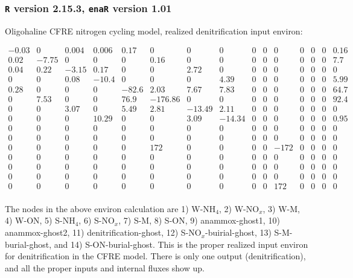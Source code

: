 \documentclass[]{article}
\begin{document}
\subsubsection{\texttt{R} version 2.15.3, \texttt{enaR} version 1.01}

Oligohaline CFRE nitrogen cycling model, realized denitrification input environ:  

\tiny

\[
\begin{array}{ccccccccccccccc}
  -0.03 & 0 & 0.004 & 0.006 & 0.17 & 0 & 0 & 0 & 0 & 0 & 0 & 0 & 0 & 0 &
  0.16  \\
  0.02 & -7.75 & 0 & 0 & 0 & 0.16 & 0 & 0 & 0 & 0 & 0 & 0 & 0 & 0 & 7.7
  \\
  0.04 & 0.22 & -3.15 & 0.17 & 0 & 0 & 2.72 & 0 & 0 & 0 & 0 & 0 & 0 & 0
  & 0 \\
  0 & 0 & 0.08 & -10.4 & 0 & 0 & 0 & 4.39 & 0 & 0 & 0 & 0 & 0 & 0 & 5.99
  \\
  0.28 & 0 & 0 & 0 & -82.6 & 2.03 & 7.67 & 7.83 & 0 & 0 & 0 & 0 & 0 & 0
  & 64.7 \\
  0 & 7.53 & 0 & 0 & 76.9 & -176.86 & 0 & 0 & 0 & 0 & 0 & 0 & 0 & 0 &
  92.4 \\
  0 & 0 & 3.07 & 0 & 5.49 & 2.81 & -13.49 & 2.11 & 0 & 0 & 0 & 0 & 0 & 0
  & 0 \\
  0 & 0 & 0 & 10.29 & 0 & 0 & 3.09 & -14.34 & 0 & 0 & 0 & 0 & 0 & 0 &
  0.95 \\
  0 & 0 & 0 & 0 & 0 & 0 & 0 & 0 & 0 & 0 & 0 & 0 & 0 & 0 & 0 \\
  0 & 0 & 0 & 0 & 0 & 0 & 0 & 0 & 0 & 0 & 0 & 0 & 0 & 0 & 0 \\
  0 & 0 & 0 & 0 & 0 & 172 & 0 & 0 & 0 & 0 & -172 & 0 & 0 & 0 & 0 \\
  0 & 0 & 0 & 0 & 0 & 0 & 0 & 0 & 0 & 0 & 0 & 0 & 0 & 0 & 0 \\
  0 & 0 & 0 & 0 & 0 & 0 & 0 & 0 & 0 & 0 & 0 & 0 & 0 & 0 & 0 \\
  0 & 0 & 0 & 0 & 0 & 0 & 0 & 0 & 0 & 0 & 0 & 0 & 0 & 0 & 0 \\
  0 & 0 & 0 & 0 & 0 & 0 & 0 & 0 & 0 & 0 & 172 & 0 & 0 & 0 & 0 \\
\end{array}
\]

\normalsize

The nodes in the above environ calculation are 1) W-NH$_4$, 2)
W-NO$_x$, 3) W-M, 4) W-ON, 5) S-NH$_4$, 6) S-NO$_x$, 7) S-M, 8) S-ON,
9) anammox-ghost1, 10) anammox-ghost2, 11) denitrification-ghost, 12)
S-NO$_x$-buirial-ghost, 13) S-M-burial-ghost, and 14) S-ON-burial-ghost.
This is the proper realized input environ for denitrification in the
CFRE model.  There is only one output (denitrification), and all
the proper inputs and internal fluxes show up.
\end{document}
